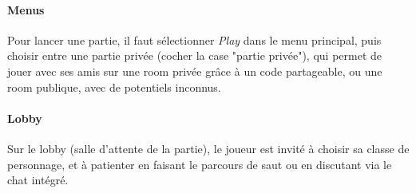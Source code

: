 \paragraph{Menus}

    Pour lancer une partie, il faut sélectionner \textit{Play} dans le menu principal, puis choisir 
    entre une partie privée (cocher la case "partie privée"), qui permet de jouer avec ses amis sur une 
    room privée grâce à un code partageable, ou une room publique, avec de potentiels inconnus.

\paragraph{Lobby}

    Sur le lobby (salle d'attente de la partie), le joueur est invité à choisir sa classe de personnage, et à 
    patienter en faisant le parcours de saut ou en discutant via le chat intégré.

    